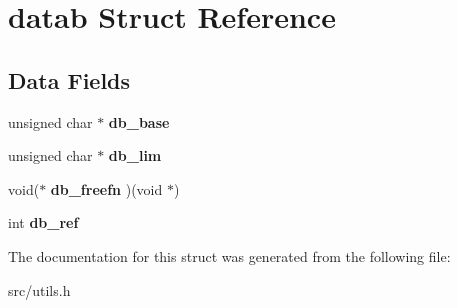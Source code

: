 \section{datab Struct Reference}
\label{structdatab}
\subsection*{Data Fields}
\begin{DoxyCompactItemize}
\item 
\mbox{\label{structdatab_a3f8ed685cb1471f131c97bce919854cb}} 
unsigned char $\ast$ {\bfseries db\+\_\+base}
\item 
\mbox{\label{structdatab_a30ffbcff751eda4136921370195fefc0}} 
unsigned char $\ast$ {\bfseries db\+\_\+lim}
\item 
\mbox{\label{structdatab_a5e4236e2281dc896fc9cfbc54a0296ee}} 
void($\ast$ {\bfseries db\+\_\+freefn} )(void $\ast$)
\item 
\mbox{\label{structdatab_a65b7ca8c24f32fe5ecc3079ea7308c07}} 
int {\bfseries db\+\_\+ref}
\end{DoxyCompactItemize}


The documentation for this struct was generated from the following file\+:\begin{DoxyCompactItemize}
\item 
src/utils.\+h\end{DoxyCompactItemize}
